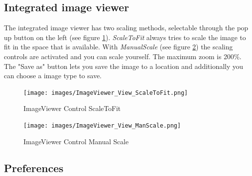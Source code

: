 \documentclass[12pt,a4]{article}
\begin{document}
\subsection{Integrated image viewer}
\label{gui_imageviewer}
\medskip
The integrated image viewer has two scaling methods, selectable through the pop up button on the left (see figure \ref{image:imageviewer_scaletofit}). \textit{ScaleToFit} always tries to scale the image to fit in the space that is available. With \textit{ManualScale} (see figure \ref{image:imageviewer_manualscale}) the scaling controls are activated and you can scale yourself. The maximum zoom is 200\%. \\
The "Save as" button lets you save the image to a location and additionally you can choose a image type to save. 
% 
\begin{figure}[ht]
\begin{center}
\texttt{[image: images/ImageViewer\_View\_ScaleToFit.png]}
\end{center}
\caption{ImageViewer Control ScaleToFit}
\label{image:imageviewer_scaletofit}
\end{figure}
\noindent
%
% 
\begin{figure}[ht]
\begin{center}
\texttt{[image: images/ImageViewer\_View\_ManScale.png]}
\end{center}
\caption{ImageViewer Control Manual Scale}
\label{image:imageviewer_manualscale}
\end{figure}
\noindent

\subsection{Preferences}
\label{gui_preferences}
\medskip
\end{document}
